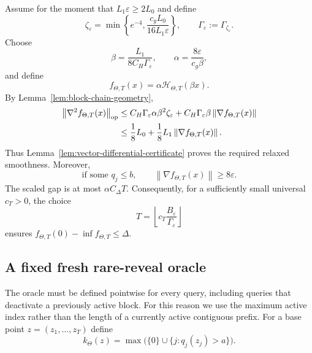 \documentclass[11pt,a4paper]{article}
\newcommand{\eps}{\varepsilon}
\newcommand{\norm}[1]{\left\lVert #1\right\rVert}
\theoremstyle{remark}
\begin{document}
Assume for the moment that $L_1\eps\ge2L_0$ and define
\begin{equation}
 \zeta_\eps
 =\min\left\{e^{-4},\frac{c_gL_0}{16L_1\eps}\right\},
 \qquad
 \Gamma_\eps:=\Gamma_{\zeta_\eps}.
 \label{eq:coarse-chain-zeta}
\end{equation}
Choose
\begin{equation}
 \beta=\frac{L_1}{8C_H\Gamma_\eps},
 \qquad
 \alpha=\frac{8\eps}{c_g\beta},
 \label{eq:coarse-chain-scaling}
\end{equation}
and define
\begin{equation}
 f_{\Theta,T}(x)=\alpha\mathcal H_{\Theta,T}(\beta x).
 \label{eq:scaled-coarse-chain}
\end{equation}
By Lemma~\ref{lem:block-chain-geometry},
\begin{align*}
 \norm{\nabla^2 f_{\Theta,T}(x)}_{\rm op}
 &\le C_H\Gamma_\eps\alpha\beta^2\zeta_\eps
      +C_H\Gamma_\eps\beta\norm{\nabla f_{\Theta,T}(x)}\\
 &\le\frac18L_0+\frac18L_1\norm{\nabla f_{\Theta,T}(x)}.
\end{align*}
Thus Lemma~\ref{lem:vector-differential-certificate} proves the required
relaxed smoothness.  Moreover,
\begin{equation}
 \text{if some }q_j\le b,
 \qquad
 \norm{\nabla f_{\Theta,T}(x)}\ge8\eps.
 \label{eq:scaled-gradient-obstruction}
\end{equation}
The scaled gap is at most $\alpha C_\Delta T$.  Consequently, for a
sufficiently small universal $c_T>0$, the choice
\begin{equation}
 T=\left\lfloor
 c_T\frac{B_\eps}{\Gamma_\eps}
 \right\rfloor
 \label{eq:coarse-chain-length}
\end{equation}
ensures
$f_{\Theta,T}(0)-\inf f_{\Theta,T}\le\Delta$.

\subsection{A fixed fresh rare-reveal oracle}

The oracle must be defined pointwise for every query, including queries that
deactivate a previously active block.  For this reason we use the maximum
active index rather than the length of a currently active contiguous prefix.
For a base point $z=(z_1,\ldots,z_T)$ define
\begin{equation}
 k_\Theta(z)
 =\max\bigl(\{0\}\cup\{j:q_j(z_j)>a\}\bigr).
 \label{eq:max-active-index}
\end{equation}
\end{document}
